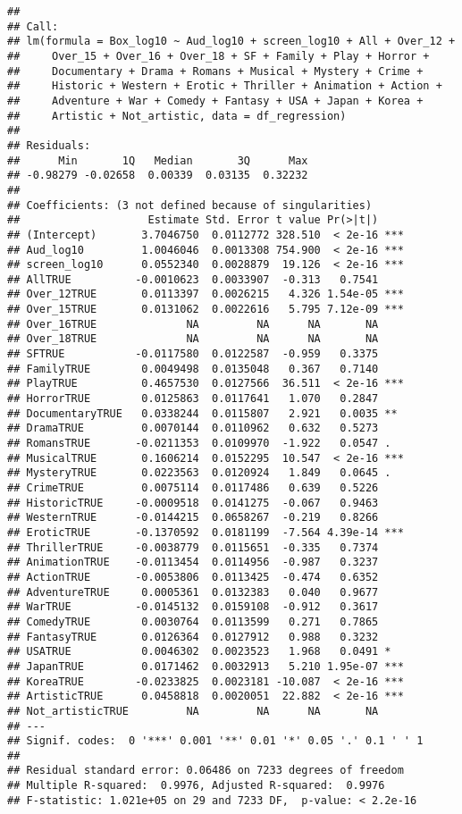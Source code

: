 \documentclass[
]{article}
\begin{document}
\begin{verbatim}
## 
## Call:
## lm(formula = Box_log10 ~ Aud_log10 + screen_log10 + All + Over_12 + 
##     Over_15 + Over_16 + Over_18 + SF + Family + Play + Horror + 
##     Documentary + Drama + Romans + Musical + Mystery + Crime + 
##     Historic + Western + Erotic + Thriller + Animation + Action + 
##     Adventure + War + Comedy + Fantasy + USA + Japan + Korea + 
##     Artistic + Not_artistic, data = df_regression)
## 
## Residuals:
##      Min       1Q   Median       3Q      Max 
## -0.98279 -0.02658  0.00339  0.03135  0.32232 
## 
## Coefficients: (3 not defined because of singularities)
##                    Estimate Std. Error t value Pr(>|t|)    
## (Intercept)       3.7046750  0.0112772 328.510  < 2e-16 ***
## Aud_log10         1.0046046  0.0013308 754.900  < 2e-16 ***
## screen_log10      0.0552340  0.0028879  19.126  < 2e-16 ***
## AllTRUE          -0.0010623  0.0033907  -0.313   0.7541    
## Over_12TRUE       0.0113397  0.0026215   4.326 1.54e-05 ***
## Over_15TRUE       0.0131062  0.0022616   5.795 7.12e-09 ***
## Over_16TRUE              NA         NA      NA       NA    
## Over_18TRUE              NA         NA      NA       NA    
## SFTRUE           -0.0117580  0.0122587  -0.959   0.3375    
## FamilyTRUE        0.0049498  0.0135048   0.367   0.7140    
## PlayTRUE          0.4657530  0.0127566  36.511  < 2e-16 ***
## HorrorTRUE        0.0125863  0.0117641   1.070   0.2847    
## DocumentaryTRUE   0.0338244  0.0115807   2.921   0.0035 ** 
## DramaTRUE         0.0070144  0.0110962   0.632   0.5273    
## RomansTRUE       -0.0211353  0.0109970  -1.922   0.0547 .  
## MusicalTRUE       0.1606214  0.0152295  10.547  < 2e-16 ***
## MysteryTRUE       0.0223563  0.0120924   1.849   0.0645 .  
## CrimeTRUE         0.0075114  0.0117486   0.639   0.5226    
## HistoricTRUE     -0.0009518  0.0141275  -0.067   0.9463    
## WesternTRUE      -0.0144215  0.0658267  -0.219   0.8266    
## EroticTRUE       -0.1370592  0.0181199  -7.564 4.39e-14 ***
## ThrillerTRUE     -0.0038779  0.0115651  -0.335   0.7374    
## AnimationTRUE    -0.0113454  0.0114956  -0.987   0.3237    
## ActionTRUE       -0.0053806  0.0113425  -0.474   0.6352    
## AdventureTRUE     0.0005361  0.0132383   0.040   0.9677    
## WarTRUE          -0.0145132  0.0159108  -0.912   0.3617    
## ComedyTRUE        0.0030764  0.0113599   0.271   0.7865    
## FantasyTRUE       0.0126364  0.0127912   0.988   0.3232    
## USATRUE           0.0046302  0.0023523   1.968   0.0491 *  
## JapanTRUE         0.0171462  0.0032913   5.210 1.95e-07 ***
## KoreaTRUE        -0.0233825  0.0023181 -10.087  < 2e-16 ***
## ArtisticTRUE      0.0458818  0.0020051  22.882  < 2e-16 ***
## Not_artisticTRUE         NA         NA      NA       NA    
## ---
## Signif. codes:  0 '***' 0.001 '**' 0.01 '*' 0.05 '.' 0.1 ' ' 1
## 
## Residual standard error: 0.06486 on 7233 degrees of freedom
## Multiple R-squared:  0.9976, Adjusted R-squared:  0.9976 
## F-statistic: 1.021e+05 on 29 and 7233 DF,  p-value: < 2.2e-16
\end{verbatim}
\end{document}
